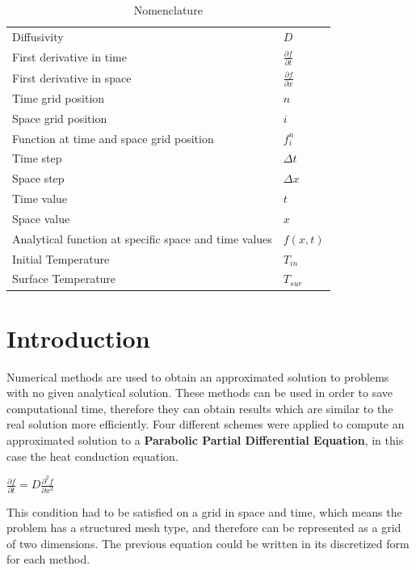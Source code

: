 \documentclass[12pt]{report}
\begin{document}
\begin{table}[tb]
\caption{Nomenclature}
\label{tab:notation}
\centering
\def\arraystretch{1.5}
\begin{tabular}{ll}
Diffusivity & $D$\\
First derivative in time & $\frac{\partial f}{\partial t}$\\
First derivative in space & $\frac{\partial f}{\partial x}$\\
Time grid position & $n$\\
Space grid position & $i$\\
Function at time and space grid position & $f_i^n$\\
Time step & $\Delta t$\\
Space step & $\Delta x$\\
Time value & $t$\\
Space value & $x$\\
Analytical function at specific space and time values& $f(x, t)$\\
Initial Temperature& $T_{in}$\\
Surface Temperature& $T_{sur}$\\
\end{tabular}
\end{table}


\section*{Introduction}
Numerical methods are used to obtain an approximated solution to problems with no given analytical solution. These methods can be used in order to save computational time, therefore they can obtain results which are similar to the real solution more efficiently. Four different schemes were applied to compute an approximated solution to a \textbf{Parabolic Partial Differential Equation}, in this case the heat conduction equation. 
\begin{center}
\Large
$
\frac{\partial f}{\partial t} = D\frac{\partial ^2 f}{\partial x^2} 
$
\end{center}
\par 
This condition had to be satisfied on a grid in space and time, which means the problem has a structured mesh type, and therefore can be represented as a grid of two dimensions. The previous equation could be written in its discretized form for each method.
\end{document}
